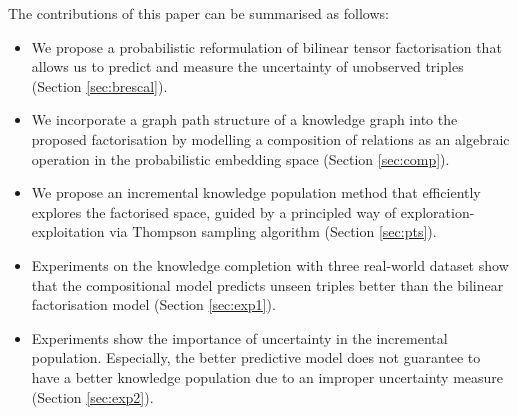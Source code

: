 The contributions of this paper can be summarised as follows:
\begin{itemize}
\item We propose a probabilistic reformulation of bilinear tensor factorisation that allows us to predict and measure the uncertainty of unobserved triples (Section \ref{sec:brescal}).
\item We incorporate a graph path structure of a knowledge graph into the proposed factorisation by modelling a composition of relations as an algebraic operation in the probabilistic embedding space (Section \ref{sec:comp}).
\item We propose an incremental knowledge population method that efficiently explores the factorised space, guided by a principled way of exploration-exploitation via Thompson sampling algorithm (Section \ref{sec:pts}).
\item Experiments on the knowledge completion with three real-world dataset show that the compositional model predicts unseen triples better than the bilinear factorisation model (Section \ref{sec:exp1}).
\item Experiments show the importance of uncertainty in the incremental population. Especially, the better predictive model does not guarantee to have a better knowledge population due to an improper uncertainty measure (Section \ref{sec:exp2}).
\end{itemize}

